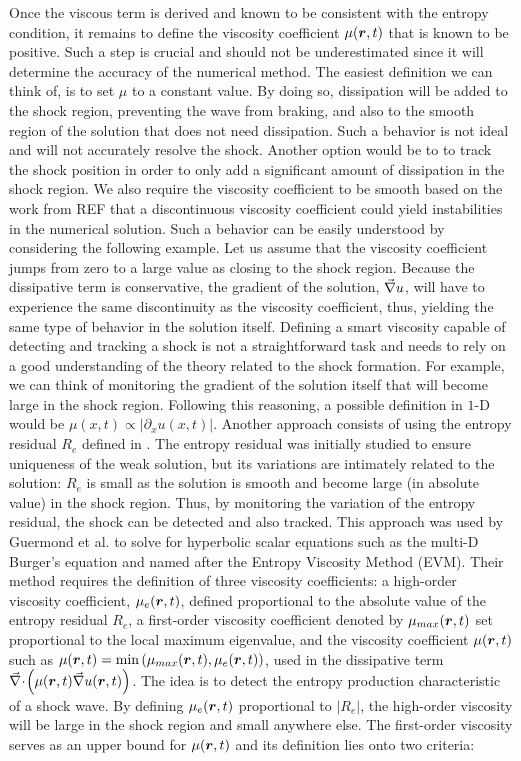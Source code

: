 Once the viscous term is derived and known to be consistent with the entropy condition, it remains to define the viscosity coefficient $\mu(\boldsymbol r,t)$ that is known to be positive. Such a step is crucial and should not be underestimated since it will determine the accuracy of the numerical method. The easiest definition we can think of, is to set $\mu$ to a constant value. By doing so, dissipation will be added to the shock region, preventing the wave from braking, and also to the smooth region of the solution that does not need dissipation. Such a behavior is not ideal and will not accurately resolve the shock. Another option would be to to track the shock position in order to only add a significant amount of dissipation in the shock region. We also require the viscosity coefficient to be smooth based on the work from REF that a discontinuous viscosity coefficient could yield instabilities in the numerical solution. Such a behavior can be easily understood by considering the following example. Let us assume that the viscosity coefficient jumps from zero to a large value as closing to the shock region. Because the dissipative term is conservative, the gradient of the solution, $\vec{\nabla} u$, will have to experience the same discontinuity as the viscosity coefficient, thus, yielding the same type of behavior in the solution itself.   
Defining a smart viscosity capable of detecting and tracking a shock is not a straightforward task and needs to rely on a good understanding of the theory related to the shock formation. For example, we can think of monitoring the gradient of the solution itself that will become large in the shock region. Following this reasoning, a possible definition in $1$-D would be $\mu(x,t) \propto \left| \partial_x u(x,t) \right|$. Another approach consists of using the entropy residual $R_e$ defined in . The entropy residual was initially studied to ensure uniqueness of the weak solution, but its variations are intimately related to the solution: $R_e$ is small as the solution is smooth and become large (in absolute value) in the shock region. Thus, by monitoring the variation of the entropy residual, the shock can be detected and also tracked. This approach was used by Guermond et al. \cite{jlg1, jlg2, jlg3} to solve for hyperbolic scalar equations such as the multi-D Burger's equation and named after the Entropy Viscosity Method (EVM). Their method requires the definition of three viscosity coefficients: a high-order viscosity coefficient, $\mu_e(\boldsymbol r,t)$, defined proportional to the absolute value of the entropy residual $R_e$,  a first-order viscosity coefficient denoted by $\mu_{max}(\boldsymbol r,t)$ set proportional to the local maximum eigenvalue, and the viscosity coefficient $\mu(\boldsymbol r,t)$ such as $\mu(\boldsymbol r,t) = \min \left( \mu_{max}(\boldsymbol r,t), \mu_e(\boldsymbol r,t) \right)$, used in the dissipative term $\vec{\nabla}\! \cdot \! \left( \mu(\boldsymbol r,t) \vec{\nabla} u(\boldsymbol r,t) \right)$. The idea is to detect the entropy production characteristic of a shock wave. By defining $\mu_e(\boldsymbol r,t)$ proportional to $\left| R_e \right|$, the high-order viscosity will be large in the shock region and small anywhere else. The first-order viscosity serves as an upper bound for $\mu(\boldsymbol r,t)$ and its definition lies onto two criteria:

